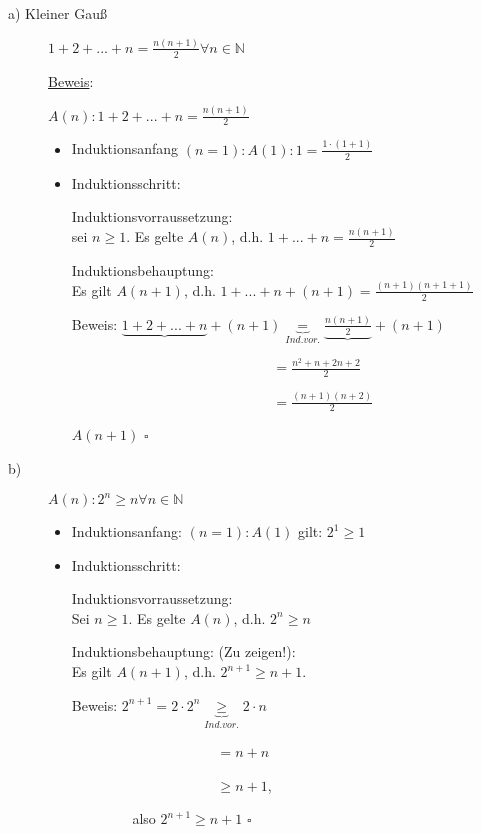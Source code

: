\documentclass[a4paper, 12pt, twoside] {article}
\begin{document}
\begin{description}

\item[a) Kleiner Gauß]
$1 + 2 + ... + n = \frac{n(n+1)}{2} \forall n \in \mathbb{N}$

\underline{Beweis}:

$A(n) : 1 + 2 + ... + n = \frac{n(n+1)}{2}$

\begin{itemize}
\item Induktionsanfang $(n = 1): A(1): 1 = \frac{1 \cdot (1+1)}{2}$
\item Induktionsschritt:

Induktionsvorraussetzung: \\
sei $n \geq 1$. Es gelte $A(n)$, d.h. $1+ ... +n = \frac{n(n+1)}{2}$

Induktionsbehauptung: \\
Es gilt $A(n+1)$, d.h. $1+ ... +n + (n+1) = \frac{(n+1) (n+1 + 1)}{2}$

Beweis: $\underbrace{1 + 2 + ... + n}_{} + (n+1) \underbrace{=}_{Ind.vor.} \underbrace{\frac{n(n+1)}{2}} + (n+1)$

$\qquad\qquad\qquad\qquad\qquad\qquad\qquad$ \space
$ = \frac{n^2 + n + 2n + 2}{2}$

$\qquad\qquad\qquad\qquad\qquad\qquad\qquad$ \space
$=\frac{(n+1)(n+2)}{2}$

$A(n+1)$ \hfill $\square$

\end{itemize}

\item[b)]

$A(n): 2^n \geq n \forall n \in \mathbb{N}$
\begin{itemize}
\item Induktionsanfang: $(n = 1 ) : A(1)$ gilt: $2^1 \geq 1$
\item Induktionsschritt:

Induktionsvorraussetzung: \\
Sei $n \geq 1$. Es gelte $A(n)$, d.h. $2^n \geq n$

Induktionsbehauptung: (Zu zeigen!): \\
Es gilt $A(n+1)$, d.h. $2^{n+1} \geq n+1$.

Beweis: $2^{n+1} = 2 \cdot 2^n \underbrace{\geq}_{Ind.vor.} 2  \cdot  n$

$\qquad\qquad\qquad\qquad\qquad$
$= n + n$

$\qquad\qquad\qquad\qquad\qquad$
$\geq n + 1$,

$\qquad\qquad$
also \qquad $2^{n+1} \geq n+1$ \hfill $\square$
\end{itemize}

\end{description}
\end{document}
